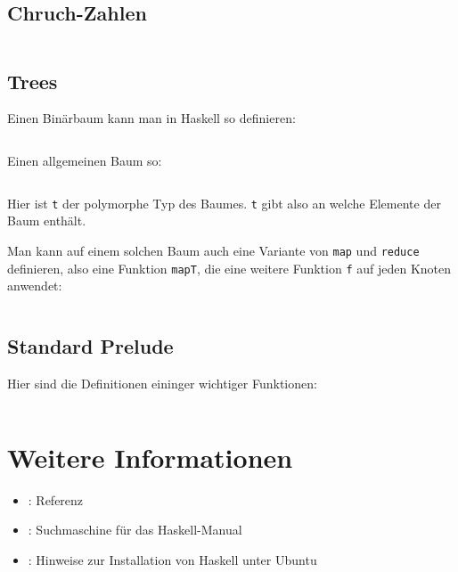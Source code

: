 \subsection{Chruch-Zahlen}
\inputminted[linenos, numbersep=5pt, tabsize=4, frame=lines, label=church.hs]{haskell}{scripts/haskell/church.hs}

\subsection{Trees}%
Einen Binärbaum kann man in Haskell so definieren:

\inputminted[numbersep=5pt, tabsize=4]{haskell}{scripts/haskell/binary-tree.hs}

Einen allgemeinen Baum so:

\inputminted[numbersep=5pt, tabsize=4]{haskell}{scripts/haskell/general-tree.hs}

Hier ist \texttt{t} der polymorphe Typ des Baumes. \texttt{t} gibt also an welche
Elemente der Baum enthält.

Man kann auf einem solchen Baum auch eine Variante von \texttt{map} und 
\texttt{reduce} definieren,
also eine Funktion \texttt{mapT}, die eine weitere Funktion \texttt{f} auf jeden
Knoten anwendet:

\inputminted[numbersep=5pt, tabsize=4]{haskell}{scripts/haskell/mapt.hs}

\subsection{Standard Prelude}
Hier sind die Definitionen eininger wichtiger Funktionen:
\inputminted[numbersep=5pt, tabsize=4]{haskell}{scripts/haskell/standard-definitions.hs}

\section{Weitere Informationen}
\begin{itemize}
    \item \href{http://hackage.haskell.org/package/base-4.6.0.1}{}: Referenz
    \item \href{http://www.haskell.org/hoogle/}{}: Suchmaschine für das Haskell-Manual
    \item \href{http://wiki.ubuntuusers.de/Haskell}{}: Hinweise zur Installation von Haskell unter Ubuntu
\end{itemize}


